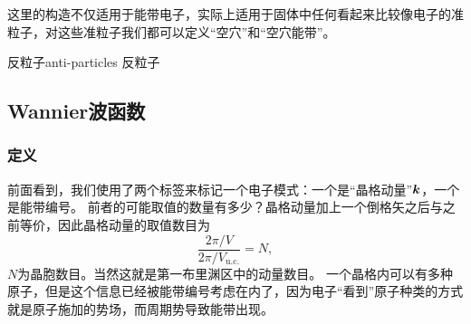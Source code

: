 这里的构造不仅适用于能带电子，实际上适用于固体中任何看起来比较像电子的准粒子，对这些准粒子我们都可以定义“空穴”和“空穴能带”。

\begin{back}{反粒子}{anti-particles}
    反粒子 %
\end{back}

\subsection{Wannier波函数}

\subsubsection{定义}

前面看到，我们使用了两个标签来标记一个电子模式：一个是“晶格动量”$\vb*{k}$，一个是能带编号。
前者的可能取值的数量有多少？晶格动量加上一个倒格矢之后与之前等价，因此晶格动量的取值数目为
\[
    \frac{2\pi / V}{2\pi / V_\text{u.c.}} = N,
\]
$N$为晶胞数目。当然这就是第一布里渊区中的动量数目。
一个晶格内可以有多种原子，但是这个信息已经被能带编号考虑在内了，因为电子“看到”原子种类的方式就是原子施加的势场，而周期势导致能带出现。

